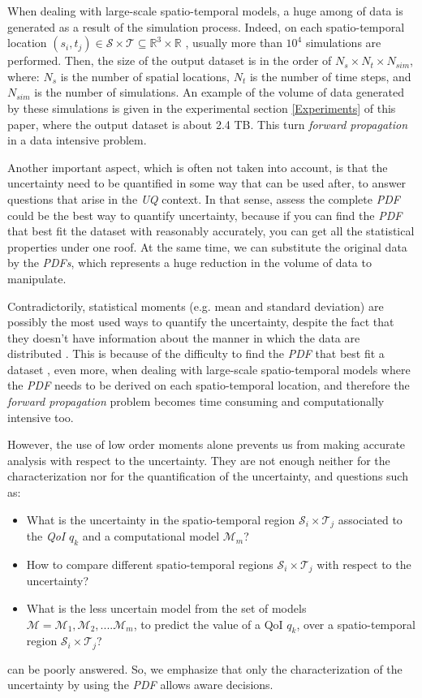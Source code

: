When dealing with large-scale spatio-temporal models, a huge among of data is generated as a result of the simulation process. Indeed, on each spatio-temporal location $(s_{i},t_{j}) \in \mathcal{S} \times \mathcal{T}\subseteq\mathbb{R}^{3}\times\mathbb{R}$ , usually more than $10^4$ simulations are performed. Then, the size of the output dataset is in the order of $N_{s}\times N_{t}\times N_{sim}$, where: $N_{s}$ is the number of spatial locations, $N_{t}$ is the number of time steps, and $N_{sim}$ is the number of simulations.  An example of the volume of data generated by these simulations is given in the experimental section \ref{Experiments} of this paper, where the output dataset is about 2.4 TB. This turn \textit{forward propagation} in a data intensive problem.

Another important aspect, which is often not taken into account, is that the uncertainty need to be quantified in some way that can be used after, to answer questions that arise in the \textit{UQ} context. In that sense, assess the complete \textit {PDF} could be the best way to quantify uncertainty, because if you can find the \textit {PDF} that best fit the dataset with reasonably accurately, you can get all the statistical properties under one roof. At the same time, we can substitute the original data by the \textit {PDFs}, which represents a huge reduction in the volume of data to manipulate.

Contradictorily, statistical moments (e.g. mean and standard deviation) are possibly the most used ways to quantify the uncertainty, despite the fact that they doesn't have information about the manner in which the data are distributed \cite{Lampasi2006}. This is because of the difficulty to find the \textit{PDF} that best fit a dataset \cite{Karian2011},  even more, when dealing with large-scale spatio-temporal models where the \textit{PDF} needs to be derived on each spatio-temporal location, and therefore the  \textit{forward propagation} problem becomes time consuming and computationally intensive too.

However, the use of low order moments alone prevents us from making accurate analysis with respect to the uncertainty. They are not enough neither for the characterization nor for the quantification of the uncertainty, and questions such as:
\begin{itemize}
\item What is the uncertainty in the spatio-temporal region $\mathcal{S}_{i} \times \mathcal{T}_{j}$ associated to the \textit{QoI} 
$q_{k}$  and a computational model $\mathcal{M}_{m}$?
\item How to compare different spatio-temporal regions $\mathcal{S}_{i} \times \mathcal{T}_{j}$ with respect to the uncertainty? 
\item What is the less uncertain model from the set of models $\mathcal{M}={\mathcal{M}_{1},\mathcal{M}_{2},
....\mathcal{M}_{m}}$, to predict the value of a QoI $q_{k}$, over a spatio-temporal region $\mathcal{S}_{i} \times \mathcal{T}_{j}$?
\end{itemize}
can be poorly answered. So, we emphasize that only the characterization of the uncertainty by using the \textit{PDF} allows aware decisions.

